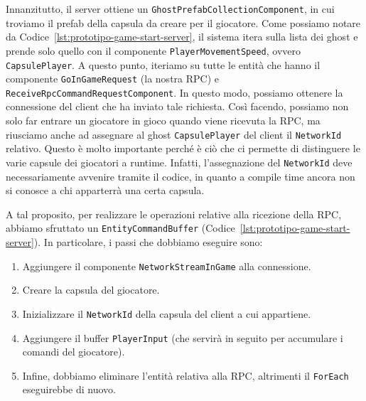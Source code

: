 Innanzitutto, il server ottiene un  \verb|GhostPrefabCollectionComponent|, in cui troviamo il prefab della capsula da creare per il giocatore. Come possiamo notare da Codice~\ref{lst:prototipo-game-start-server}, il sistema itera sulla lista dei ghost e prende solo quello con il componente \verb|PlayerMovementSpeed|, ovvero \verb|CapsulePlayer|. A questo punto, iteriamo su tutte le entità che hanno il componente \verb|GoInGameRequest| (la nostra RPC) e \verb|ReceiveRpcCommandRequestComponent|. In questo modo, possiamo ottenere la connessione del client che ha inviato tale richiesta. Così facendo, possiamo non solo far entrare un giocatore in gioco quando viene ricevuta la RPC, ma riusciamo anche ad assegnare al ghost \verb|CapsulePlayer| del client il \verb|NetworkId| relativo. Questo è molto importante perché è ciò che ci permette di distinguere le varie capsule dei giocatori a runtime. Infatti, l'assegnazione del \verb|NetworkId| deve necessariamente avvenire tramite il codice, in quanto a compile time ancora non si conosce a chi apparterrà una certa capsula.

A tal proposito, per realizzare le operazioni relative alla ricezione della RPC, abbiamo sfruttato un \verb|EntityCommandBuffer| (Codice~\ref{lst:prototipo-game-start-server}). In particolare, i passi che dobbiamo eseguire sono:
\begin{enumerate}
    \item Aggiungere il componente \verb|NetworkStreamInGame| alla connessione.
    \item Creare la capsula del giocatore.
    \item Inizializzare il \verb|NetworkId| della capsula del client a cui appartiene.
    \item Aggiungere il buffer \verb|PlayerInput| (che servirà in seguito per accumulare i comandi del giocatore).
    \item Infine, dobbiamo eliminare l'entità relativa alla RPC, altrimenti il \verb|ForEach| eseguirebbe di nuovo.
\end{enumerate}


